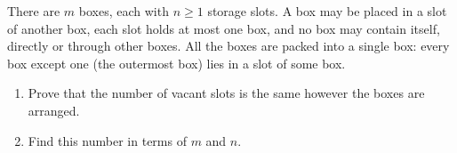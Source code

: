 There are $m$ boxes, each with $n\ge1$ storage slots. A box may be placed in a slot of another box, each slot holds at most one box, and no box may contain itself, directly or through other boxes. All the boxes are packed into a single box: every box except one (the outermost box) lies in a slot of some box.
\begin{enumerate}
\item[(a)] Prove that the number of vacant slots is the same however the boxes are arranged.
\item[(b)] Find this number in terms of $m$ and $n$.
\end{enumerate}
